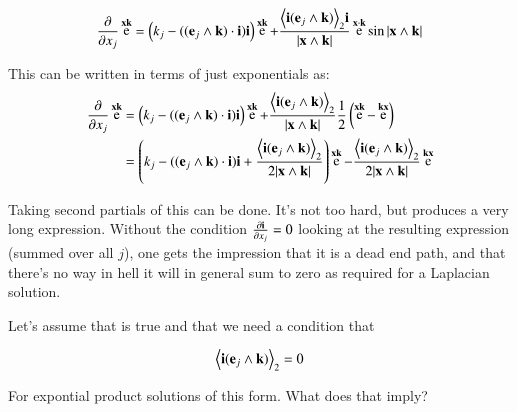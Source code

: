 \documentclass{article}      %
\newcommand{\dxj}[2] {\frac {\partial {#1}} {\partial {x_{#2}}}}
\newcommand{\dsqxj}[2] {\frac {\partial^2 {#1}} {\partial {x_{#2}}^2}}
\DeclareMathOperator{\Exp}{e}
\newcommand{\gpgrade}[2] {{\left\langle{{#1}}\right\rangle}_{#2}}
\newcommand{\gpgradetwo}[1] {\gpgrade{#1}{2}}
\begin{document}
\begin{equation}
\dxj{}{j}\Exp^{\Bx\Bk}
= 
\left(k_j - ((\Be_j \wedge \Bk) \cdot \Bi) \Bi \right) \Exp^{\Bx\Bk} + 
\frac{\gpgradetwo{\Bi (\Be_j \wedge \Bk)} \Bi}{\abs{\Bx \wedge \Bk}} 
\Exp^{\Bx \cdot \Bk} \sin{\abs{\Bx \wedge \Bk}}
\end{equation}

This can be written in terms of just exponentials as:
\begin{align*}
\dxj{}{j}\Exp^{\Bx\Bk}
&= 
\left(k_j - ((\Be_j \wedge \Bk) \cdot \Bi) \Bi \right) \Exp^{\Bx\Bk} + 
\frac{\gpgradetwo{\Bi (\Be_j \wedge \Bk)} }{\abs{\Bx \wedge \Bk}} 
\inv{2}\left( \Exp^{\Bx \Bk} -\Exp^{\Bk \Bx} \right) \\
&= 
\left(k_j - ((\Be_j \wedge \Bk) \cdot \Bi) \Bi 
+\frac{\gpgradetwo{\Bi (\Be_j \wedge \Bk)} }{2\abs{\Bx \wedge \Bk}} 
\right) \Exp^{\Bx\Bk} - 
\frac{\gpgradetwo{\Bi (\Be_j \wedge \Bk)} }{2\abs{\Bx \wedge \Bk}} 
\Exp^{\Bk \Bx} \\
\end{align*}

Taking second partials of this can be done.  It's not too hard, but
produces a very long expression.  Without the condition $\dxj{\Bi}{j} = 0$
looking at the resulting expression (summed over all $j$), one gets the
impression that it is a dead end path, and that there's no way in hell it
will in general sum to zero as required for a Laplacian solution.

Let's assume that is true and that we need a condition that

\[
\gpgradetwo{\Bi (\Be_j \wedge \Bk)} = 0
\]

For expontial product solutions of this form.  What does that imply?


%
\end{document}
